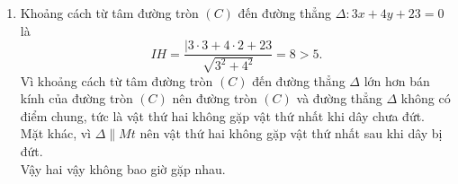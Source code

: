 \begin{bt}
{\begin{enumerate}
{
			}
			\item Khoảng cách từ tâm đường tròn $(C)$ đến đường thẳng $\Delta\colon 3x+4y+23=0$ là
			$$IH=\dfrac{|3\cdot 3+4\cdot 2+23}{\sqrt{3^2+4^2}}=8>5.$$
			Vì khoảng cách từ tâm đường tròn $(C)$ đến đường thẳng $\Delta$ lớn hơn bán kính của đường tròn $(C)$ nên đường tròn $(C)$ và đường thẳng $\Delta$ không có điểm chung, tức là vật thứ hai không gặp vật thứ nhất khi dây chưa đứt.\\
			Mặt khác, vì $\Delta \parallel Mt$ nên vật thứ hai không gặp vật thứ nhất sau khi dây bị đứt.\\
			Vậy hai vậy không bao giờ gặp nhau.
		\end{enumerate}
	}
\end{bt}

